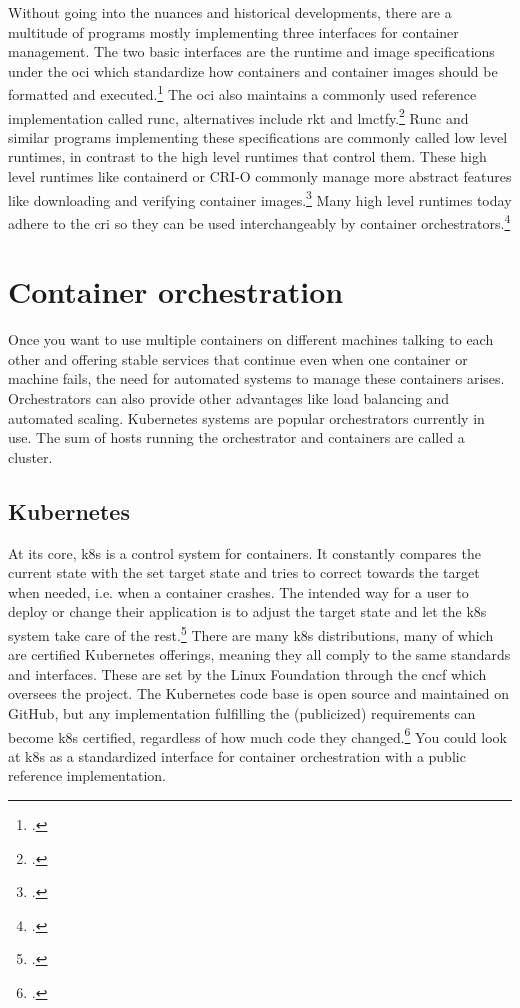 Without going into the nuances and historical developments, there are a multitude of programs mostly implementing three interfaces for container management.
The two basic interfaces are the runtime and image specifications under the \gls{oci} which standardize how containers and container images should be formatted and executed.\footcite[][, first paragraph]{ociStandards}
The \gls{oci} also maintains a commonly used reference implementation called runc, alternatives include rkt and lmctfy.\footcite[][, section 'Examples of Low-Level Container Runtimes']{lowLevelRuntimes}
Runc and similar programs implementing these specifications are commonly called low level runtimes, in contrast to the high level runtimes that control them.
These high level runtimes like containerd or CRI-O commonly manage more abstract features like downloading and verifying container images.\footcite[][, Intro and section 'Examples of High-Level Runtimes']{highLevelRuntimes}
Many high level runtimes today adhere to the \gls{cri} so they can be used interchangeably by container orchestrators.\footcite[][, section 'Purpose']{criGithub}


\section{Container orchestration}
Once you want to use multiple containers on different machines talking to each other and offering stable services that continue even when one container or machine fails, the need for automated systems to manage these containers arises. Orchestrators can also provide other advantages like load balancing and automated scaling.
Kubernetes systems are popular orchestrators currently in use.
The sum of hosts running the orchestrator and containers are called a cluster.

\subsection{Kubernetes} \label{k8sTheory}
At its core, \gls{k8s} is a control system for containers.
It constantly compares the current state with the set target state and tries to correct towards the target when needed, i.e. when a container crashes.
The intended way for a user to deploy or change their application is to adjust the target state and let the \gls{k8s} system take care of the rest.\footcite[][, section 'Understanding Kubernetes Objects']{k8sObjects}
There are many \gls{k8s} distributions, many of which are certified Kubernetes offerings, meaning they all comply to the same standards and interfaces. These are set by the Linux Foundation through the \gls{cncf} which oversees the project.
The Kubernetes code base is open source and maintained on GitHub, but any implementation fulfilling the (publicized) requirements can become \gls{k8s} certified, regardless of how much code they changed.\footcite[][, section 'There are over 80 Certified Kubernetes offerings.']{certifiedK8s} You could look at \gls{k8s} as a standardized interface for container orchestration with a public reference implementation.

